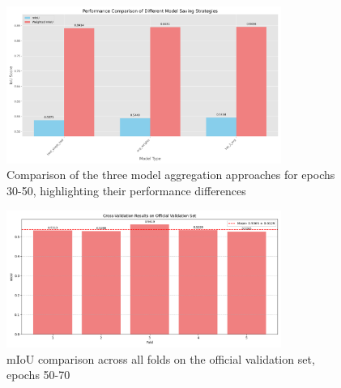 \documentclass[]{article}
\begin{document}
\begin{figure}[htbp]
    \centering
    \includegraphics[width=0.8\textwidth]{figures/3model_comparison_30_50.png}
    \caption{Comparison of the three model aggregation approaches for epochs 30-50, highlighting their performance differences}
    \label{fig:3model_comparison_30_50}
\end{figure}



\begin{figure}[htbp]
    \centering
    \includegraphics[width=0.8\textwidth]{figures/folds_50_70.png}
    \caption{mIoU comparison across all folds on the official validation set, epochs 50-70}
    \label{fig:cross_val_50_70_val}
\end{figure}
\end{document}
